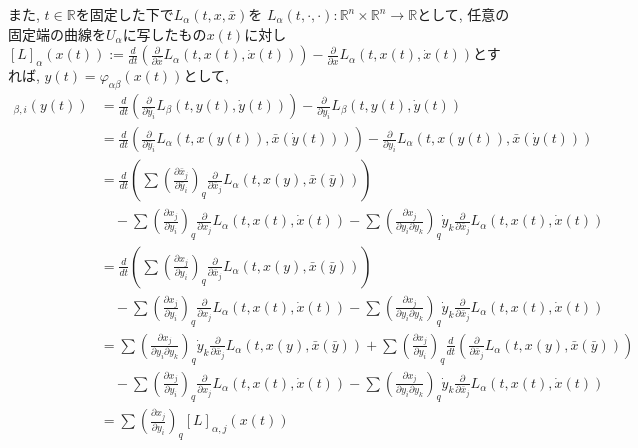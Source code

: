 \documentclass[a4paper]{ujarticle}
\numberwithin{equation}{section}
\theoremstyle{definition}
\begin{document}
        また, $t \in \mathbb{R}$を固定した下で$L_{\alpha}(t, x, \bar{x})$を
        $L_{\alpha}(t, \cdot, \cdot): \mathbb{R}^n \times \mathbb{R}^n \rightarrow \mathbb{R}$として,
        任意の固定端の曲線を$U_{\alpha}$に写したもの$x(t)$に対し
        $\displaystyle [L]_{\alpha}(x(t)) := \frac{d}{d t}\left(\frac{\partial}{\partial \bar{x}}L_{\alpha}(t, x(t), \dot{x}(t))\right) - \frac{\partial}{\partial x}L_{\alpha}(t, x(t), \dot{x}(t))$とすれば,
        $y(t) = \varphi_{\alpha \beta}(x(t))$として, 
        \begin{align}
            [L]_{\beta, i}(y(t)) 
            &= \frac{d}{d t}\left(\frac{\partial}{\partial \bar{y}_i}L_{\beta}(t, y(t), \dot{y}(t))\right) - \frac{\partial}{\partial y_i}L_{\beta}(t, y(t), \dot{y}(t))\\
            &= \frac{d}{d t}\left(\frac{\partial}{\partial \bar{y}_i}L_{\alpha}(t, x(y(t)), \bar{x}(\dot{y}(t)))\right) - \frac{\partial}{\partial y_i}L_{\alpha}(t, x(y(t)), \bar{x}(\dot{y}(t)))\\
            &= \frac{d}{d t}\left(\sum \left(\frac{\partial \bar{x}_j}{\partial \bar{y}_i}\right)_{q} \frac{\partial}{\partial \bar{x}_j} L_{\alpha}(t, x(y), \bar{x}(\bar{y}))\right) \\
            &\quad - \sum \left(\frac{\partial x_j}{\partial y_i}\right)_{q} \frac{\partial}{\partial x_j}L_{\alpha}(t, x(t), \dot{x}(t)) - \sum \left(\frac{\partial x_j}{\partial y_i \partial y_k}\right)_{q} \dot{y}_k \frac{\partial}{\partial \bar{x}_j}L_{\alpha}(t, x(t), \dot{x}(t)) \\
            &= \frac{d}{d t}\left(\sum \left(\frac{\partial x_j}{\partial y_i}\right)_{q} \frac{\partial}{\partial \bar{x}_j} L_{\alpha}(t, x(y), \bar{x}(\bar{y}))\right) \\
            &\quad - \sum \left(\frac{\partial x_j}{\partial y_i}\right)_{q} \frac{\partial}{\partial x_j}L_{\alpha}(t, x(t), \dot{x}(t)) - \sum \left(\frac{\partial x_j}{\partial y_i \partial y_k}\right)_{q} \dot{y}_k \frac{\partial}{\partial \bar{x}_j}L_{\alpha}(t, x(t), \dot{x}(t)) \\
            &= \sum \left(\frac{\partial x_j}{\partial y_i \partial y_k}\right)_{q} \dot{y}_k \frac{\partial}{\partial \bar{x}_j} L_{\alpha}(t, x(y), \bar{x}(\bar{y})) + \sum \left(\frac{\partial x_j}{\partial y_i}\right)_{q} \frac{d}{dt} \left(\frac{\partial}{\partial \bar{x}_j} L_{\alpha}(t, x(y), \bar{x}(\bar{y}))\right)\\
            &\quad - \sum \left(\frac{\partial x_j}{\partial y_i}\right)_{q} \frac{\partial}{\partial x_j}L_{\alpha}(t, x(t), \dot{x}(t)) - \sum \left(\frac{\partial x_j}{\partial y_i \partial y_k}\right)_{q} \dot{y}_k \frac{\partial}{\partial \bar{x}_j}L_{\alpha}(t, x(t), \dot{x}(t)) \\
            &= \sum \left(\frac{\partial x_j}{\partial y_i}\right)_{q} [L]_{\alpha, j}(x(t)) 
        \end{align}
\end{document}
